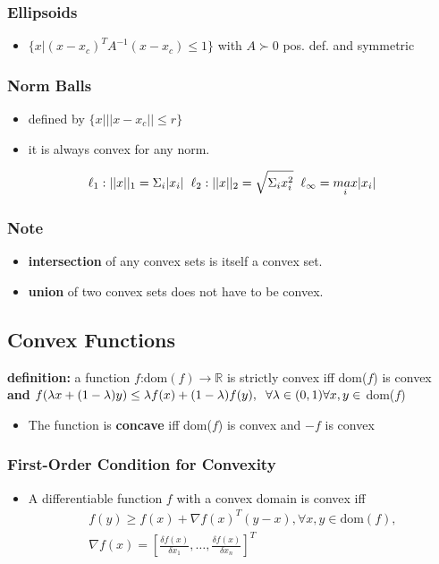 \subsubsection{Ellipsoids}
\begin{itemize}
    \item $\{x|(x-x_c)^T A^{-1}(x-x_c) \leq 1\}$ with  $A\succ 0$ pos. def. and symmetric
\end{itemize}
\subsubsection{Norm Balls}
\begin{itemize}
    \item defined by $\{x|||x-x_c|| \leq r\}$
    \item it is always convex for any norm. 
\end{itemize}
    \begin{gather*}\ell_1: ||x||_1 = \Sigma_i|x_i| \hspace{2mm} \ell_2: ||x||_2 = \sqrt{\Sigma_ix_i^2} \hspace{2mm} \ell_\infty = \underset{i}{max}|x_i|
    \end{gather*}
\subsubsection{Note}
\begin{itemize}
    \item \textbf{intersection} of any convex sets is itself a convex set.
    \item \textbf{union} of two convex sets does not have to be convex.
\end{itemize}
\subsection{Convex Functions}
\textbf{definition: }a function $f$:dom$(f) \rightarrow \mathbb{R}$ is strictly convex iff dom($f$) is convex \textbf{and} $f(\lambda x+(1-\lambda)y) \leq \lambda f(x) + (1-\lambda)f(y), \hspace{2mm} \forall \lambda \in (0,1) \forall x,y \in $ dom($f$)
\begin{itemize}
    \item The function is \textbf{concave} iff dom($f$) is convex and $-f$ is convex
\end{itemize}
\subsubsection{First-Order Condition for Convexity}
\begin{itemize}
    \item A differentiable function $f$ with a convex domain is convex iff
    \begin{gather*}f(y) \geq f(x) + \nabla f(x)^T (y-x), \forall x,y \in \mathrm{dom}(f), \\\nabla f(x) = [\frac{\delta f(x)}{\delta x_1},\dots, \frac{\delta f(x)}{\delta x_n}]^T\end{gather*}
\end{itemize}
